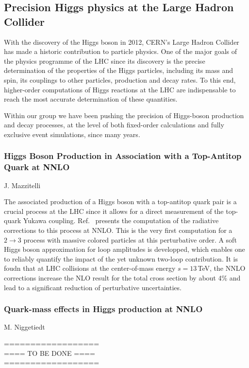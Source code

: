 \documentclass{FBR_Bericht_2025}
\begin{document}
\subsection{Precision Higgs physics at the Large Hadron Collider}
\begin{refsection}
With the discovery of the Higgs boson in 2012, CERN's Large Hadron Collider has made a 
historic contribution to particle physics. One of the major goals of the physics programme
of the LHC since its discovery is the precise determination of the properties of the Higgs
particles, including its mass and spin, its couplings to other particles, production and decay
rates. To this end, higher-order computations of Higgs reactions at the LHC are indispensable
to reach the most accurate determination of these quantities.

Within our group we have been pushing the precision of Higgs-boson production and decay
processes, at the level of both fixed-order calculations and fully exclusive event simulations,
since many years. 


\subsubsection{Higgs Boson Production in Association with a Top-Antitop Quark at NNLO}
\begin{Namen}
 J. Mazzitelli 
\end{Namen}

The associated production of a Higgs boson with a top-antitop quark pair is a crucial process at the LHC since it allows for a direct measurement of the top-quark Yukawa coupling. Ref.~\cite{Catani:2022mfv} presents the computation of the radiative corrections to this process at NNLO. This is the very first computation for a $2 \to 3$  process with massive colored particles at this perturbative order. A soft Higgs boson approximation for loop amplitudes is developped, which enables one to reliably quantify the impact of the yet unknown two-loop contribution. It is foudn that at LHC collisions at the center-of-mass energy $s=13$\,TeV, the NNLO corrections increase the NLO result for the total cross section by about 4\% and lead to a significant reduction of perturbative uncertainties.





\subsubsection{Quark-mass effects in Higgs production at NNLO}
\begin{Namen}
M. Niggetiedt
\end{Namen}
%
{\color{red} ==================\\ ====\; TO BE DONE\; ====\\ ==================}
%

\end{refsection}
\end{document}
